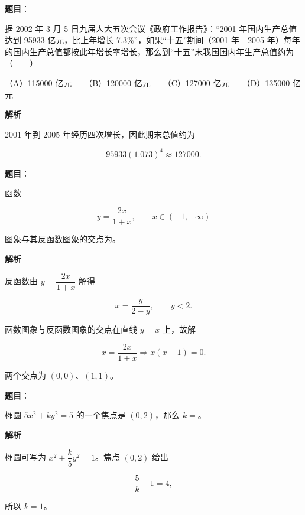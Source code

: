 \begin{answer}

\textbf{题目}：

据 2002 年 3 月 5 日九届人大五次会议《政府工作报告》：“2001 年国内生产总值达到 95933 亿元，比上年增长 7.3\%”，如果“十五”期间（2001 年—2005 年）每年的国内生产总值都按此年增长率增长，那么到“十五”末我国国内年生产总值约为\mbox{（　　）}

（A）115000 亿元　　（B）120000 亿元　　（C）127000 亿元　　（D）135000 亿元

\textbf{解析}

2001 年到 2005 年经历四次增长，因此期末总值约为

\nopagebreak[4]
\[
95933(1.073)^4\approx127000.
\]


\end{answer}
\begin{answer}

\textbf{题目}：

函数

\nopagebreak[4]
\[
y=\frac{2x}{1+x},\qquad x\in(-1,+\infty)
\]

图象与其反函数图象的交点为\gkblank{}。

\textbf{解析}

反函数由 $y=\dfrac{2x}{1+x}$ 解得

\nopagebreak[4]
\[
x=\frac{y}{2-y},\qquad y<2.
\]

函数图象与反函数图象的交点在直线 $y=x$ 上，故解

\nopagebreak[4]
\[
x=\frac{2x}{1+x}
\Longrightarrow
x(x-1)=0.
\]

两个交点为 $(0,0)$、$(1,1)$。


\end{answer}
\begin{answer}

\textbf{题目}：

椭圆 $5x^2+ky^2=5$ 的一个焦点是 $(0,2)$，那么 $k=$\gkblank{}。

\textbf{解析}

椭圆可写为 $x^2+\dfrac{k}{5}y^2=1$。焦点 $(0,2)$ 给出

\nopagebreak[4]
\[
\frac5k-1=4,
\]

所以 $k=1$。


\end{answer}
